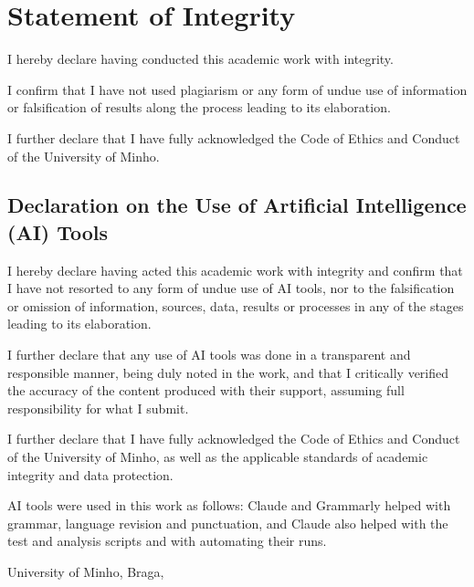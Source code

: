 \chapter*{Statement of Integrity}
\setlength{\parskip}{0.8em}
\noindent
I hereby declare having conducted this academic work with integrity.

\noindent
I confirm that I have not used plagiarism or any form of undue use of information or falsification of results along the process leading to its elaboration.

\noindent
I further declare that I have fully acknowledged the Code of Ethics and Conduct of the University of Minho.

\section*{Declaration on the Use of Artificial Intelligence (AI) Tools}

\noindent
I hereby declare having acted this academic work with integrity and confirm that I have not resorted to any form of undue use of AI tools, nor to the falsification or omission of information, sources, data, results or processes in any of the stages leading to its elaboration.

\noindent
I further declare that any use of AI tools was done in a transparent and responsible manner, being duly noted in the work, and that I critically verified the accuracy of the content produced with their support, assuming full responsibility for what I submit.

\noindent
I further declare that I have fully acknowledged the Code of Ethics and Conduct of the University of Minho, as well as the applicable standards of academic integrity and data protection.

\noindent
AI tools were used in this work as follows: Claude and Grammarly helped with grammar, language revision and punctuation, and Claude also helped with the test and analysis scripts and with automating their runs.

\noindent
University of Minho, Braga, \myear

\vspace{20mm}
\noindent\theauthor
\setlength{\parskip}{0em}
